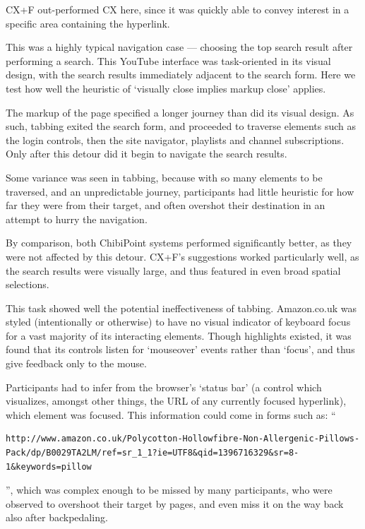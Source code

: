 \documentclass[11pt,openright,a4paper]{report}
\begin{document}
CX+F out-performed CX here, since it was quickly able to convey interest in a specific area containing the hyperlink.

This was a highly typical navigation case --- choosing the top search result after performing a search. This YouTube interface was task-oriented in its visual design, with the search results immediately adjacent to the search form. Here we test how well the heuristic of `visually close implies markup close' applies.

The markup of the page specified a longer journey than did its visual design. As such, tabbing exited the search form, and proceeded to traverse elements such as the login controls, then the site navigator, playlists and channel subscriptions. Only after this detour did it begin to navigate the search results.

Some variance was seen in tabbing, because with so many elements to be traversed, and an unpredictable journey, participants had little heuristic for how far they were from their target, and often overshot their destination in an attempt to hurry the navigation.

By comparison, both ChibiPoint systems performed significantly better, as they were not affected by this detour. CX+F's suggestions worked particularly well, as the search results were visually large, and thus featured in even broad spatial selections.

This task showed well the potential ineffectiveness of tabbing. Amazon.co.uk was styled (intentionally or otherwise) to have no visual indicator of keyboard focus for a vast majority of its interacting elements. Though highlights existed, it was found that its controls listen for `mouseover' events rather than `focus', and thus give feedback only to the mouse.

Participants had to infer from the browser's `status bar' (a control which visualizes, amongst other things, the URL of any currently focused hyperlink), which element was focused. This information could come in forms such as: ``\begin{verbatim}http://www.amazon.co.uk/Polycotton-Hollowfibre-Non-Allergenic-Pillows-Pack/dp/B0029TA2LM/ref=sr_1_1?ie=UTF8&qid=1396716329&sr=8-1&keywords=pillow\end{verbatim}'', which was complex enough to be missed by many participants, who were observed to overshoot their target by pages, and even miss it on the way back also after backpedaling.
\end{document}
